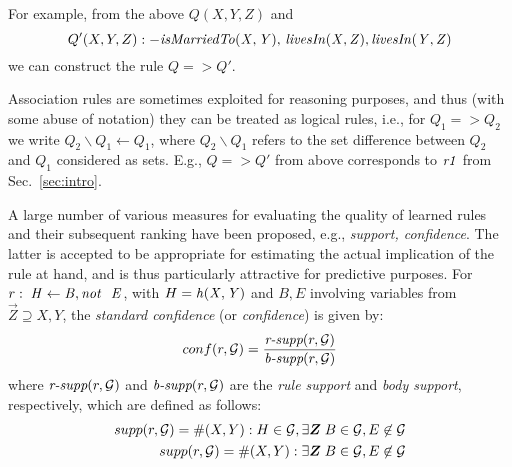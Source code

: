For example, from the above $Q(X,Y,Z)$ and
\begin{equation}Q'(X,Y,Z):-\mathit{isMarriedTo(X,Y),\,livesIn(X,Z),\,} \mathit{livesIn(Y,Z)}
\end{equation} we can construct the rule $Q => Q'$. 
 

Association rules are sometimes exploited for reasoning purposes, and thus (with some abuse of notation) they can be treated as logical rules, i.e., for $Q_1=>Q_2$ we write $Q_2\backslash Q_1 \leftarrow Q_1$, where $Q_2 \backslash Q_1$ refers to the set difference between $Q_2$ and $Q_1$ considered as sets. E.g., $Q=>Q'$ from above corresponds to $\mathit{r1}$ from Sec.~\ref{sec:intro}.

A large number of various measures for evaluating the quality of learned rules and their subsequent ranking have been proposed, e.g., \emph{support, confidence}. The latter is accepted to be appropriate for estimating the actual implication of the rule at hand, and is thus particularly attractive for predictive purposes. For $r:\;\mathit{H\leftarrow B, \mathit{not}~ \ E}$, with $H=\mathit{h(X,Y)}$ and $B,E$ involving variables from $\vec{Z}\supseteq X,Y$, the \emph{standard confidence} (or \textit{confidence}) is given by:
\vspace{-.26cm}
\begin{align*}
conf(r,\mathcal{G})= \frac{\textit{r-supp}(r,\mathcal{G})}{\textit{b-supp}(r,\mathcal{G})}
\end{align*}
where $\textit{r-supp}(r,\mathcal{G})$ and $\textit{b-supp}(r ,\mathcal{G})$ are the \textit{rule support} and \textit{body support}, respectively, which are defined as follows:
\begin{align*}
supp(r,\cG)= \#(X,Y): H \in \cG, \exists \vec{Z}\;B\in \cG,E \not \in \cG\\
supp(r,\cG)= \#(X,Y):\exists \vec{Z}\; B\in \cG, E \not \in \cG
\end{align*}



